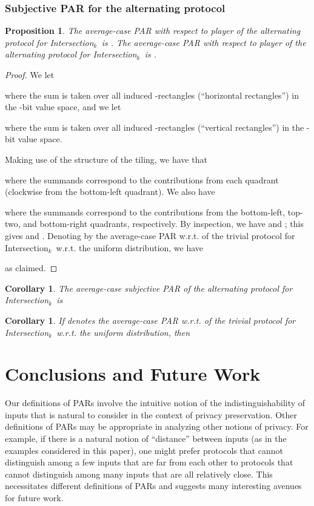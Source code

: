 \documentclass{article}
\theoremstyle{theorem}
\newtheorem{cor}[theorem]{Corollary}
\newtheorem{prop}[theorem]{Proposition}
\theoremstyle{definition}
\theoremstyle{remark}
\newcommand{\intersection}{{\sc In\-ter\-sec\-tion}\ensuremath{_k}}
\begin{document}
\subsubsection{Subjective PAR for the alternating protocol}


\begin{prop}
The average-case PAR with respect to player  of the alternating protocol for \intersection\ is .  The average-case PAR with respect to player  of the alternating protocol for \intersection\ is .
\end{prop}
\begin{proof}
We let

where the sum is taken over all induced -rectangles (``horizontal rectangles'') in the -bit value space, and we let

where the sum is taken over all induced -rectangles (``vertical rectangles'') in the -bit value space.

Making use of the structure of the tiling, we have that

where the summands correspond to the contributions from each quadrant (clockwise from the bottom-left quadrant).  We also have

where the summands correspond to the contributions from the bottom-left, top-two, and bottom-right quadrants, respectively.  By inspection, we have  and ; this gives  and .  Denoting by  the average-case PAR w.r.t.  of the trivial protocol for \intersection\ w.r.t. the uniform distribution, we have

as claimed.
\end{proof}

\begin{cor}
The average-case subjective PAR of the alternating protocol for \intersection\ is

\end{cor}

\begin{cor}
If  denotes the average-case PAR w.r.t.  of the trivial protocol for \intersection\ w.r.t. the uniform distribution, then

\end{cor}

\section{Conclusions and Future Work}\label{sec:conc}



Our definitions of PARs involve the intuitive notion of the
indistinguishability of inputs that is natural to consider in the
context of privacy preservation. Other definitions of PARs may be
appropriate in analyzing other notions of privacy. For example, if
there is a natural notion of ``distance'' between inputs (as
in the examples considered in this paper), one might prefer
protocols that cannot distinguish among a few inputs that are far
from each other to protocols that cannot distinguish among many
inputs that are all relatively close. This necessitates different
definitions of PARs and suggests many interesting avenues for
future work.
\end{document}
